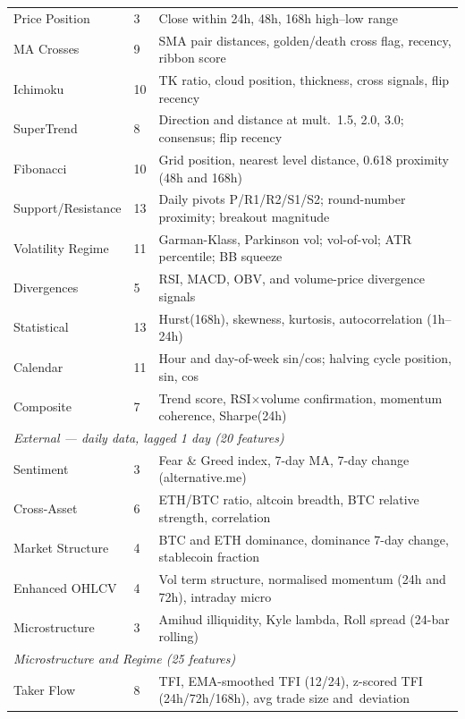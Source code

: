 \begin{longtable}{ll>{\raggedright\arraybackslash\hyphenpenalty=10000\exhyphenpenalty=10000}p{7.5cm}}
        Price Position       & 3  & Close within 24h, 48h, 168h high--low range \\
        MA Crosses           & 9  & SMA pair distances, golden/death cross flag, recency, ribbon score \\
        Ichimoku             & 10 & TK ratio, cloud position, thickness, cross signals, flip recency \\
        SuperTrend           & 8  & Direction and distance at mult.\ 1.5, 2.0, 3.0; consensus; flip recency \\
        Fibonacci            & 10 & Grid position, nearest level distance, 0.618 proximity (48h and 168h) \\
        Support/Resistance   & 13 & Daily pivots P/R1/R2/S1/S2; round-number proximity; breakout magnitude \\
        Volatility Regime    & 11 & Garman-Klass, Parkinson vol; vol-of-vol; ATR percentile; BB squeeze \\
        Divergences          & 5  & RSI, MACD, OBV, and volume-price divergence signals \\
        Statistical          & 13 & Hurst(168h), skewness, kurtosis, autocorrelation (1h--24h) \\
        Calendar             & 11 & Hour and day-of-week sin/cos; halving cycle position, sin, cos \\
        Composite            & 7  & Trend score, RSI$\times$volume confirmation, momentum coherence, Sharpe(24h) \\
        \midrule
        \multicolumn{3}{l}{\textit{External — daily data, lagged 1 day (20 features)}} \\
        Sentiment            & 3  & Fear \& Greed index, 7-day MA, 7-day change (alternative.me) \\
        Cross-Asset          & 6  & ETH/BTC ratio, altcoin breadth, BTC relative strength, correlation \\
        Market Structure     & 4  & BTC and ETH dominance, dominance 7-day change, stablecoin fraction \\
        Enhanced OHLCV       & 4  & Vol term structure, normalised momentum (24h and 72h), intraday micro \\
        Microstructure       & 3  & Amihud illiquidity, Kyle lambda, Roll spread (24-bar rolling) \\
        \midrule
        \multicolumn{3}{l}{\textit{Microstructure and Regime (25 features)}} \\
        Taker Flow           & 8  & TFI, EMA-smoothed TFI (12/24), z-scored TFI (24h/72h/168h), avg trade size and~\mbox{deviation} \\

\end{longtable}
